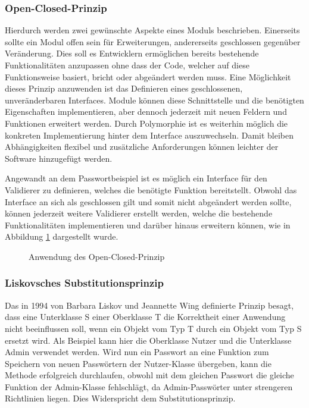\documentclass[conference]{IEEEtran}
\begin{document}
\subsubsection{Open-Closed-Prinzip} Hierdurch werden zwei gewünschte Aspekte eines Moduls beschrieben. Einerseits sollte ein Modul offen sein für Erweiterungen, andererseits geschlossen gegenüber Veränderung. Dies soll es Entwicklern ermöglichen bereits bestehende Funktionalitäten anzupassen ohne dass der Code, welcher auf diese Funktionsweise basiert, bricht oder abgeändert werden muss. Eine Möglichkeit dieses Prinzip anzuwenden ist das Definieren eines geschlossenen, unveränderbaren Interfaces. Module können diese Schnittstelle und die benötigten Eigenschaften implementieren, aber dennoch jederzeit mit neuen Feldern und Funktionen erweitert werden. Durch Polymorphie ist es weiterhin möglich die konkreten Implementierung hinter dem Interface auszuwechseln. Damit bleiben Abhängigkeiten flexibel und zusätzliche Anforderungen können leichter der Software hinzugefügt werden. 

Angewandt an dem Passwortbeispiel ist es möglich ein Interface für den  Validierer zu definieren, welches die benötigte Funktion bereitstellt. Obwohl das Interface an sich als geschlossen gilt und somit nicht abgeändert werden sollte, können jederzeit weitere Validierer erstellt werden, welche die bestehende Funktionalitäten implementieren und darüber hinaus erweitern können, wie in Abbildung \ref{OCP} dargestellt wurde. %

\begin{figure}[htbp]
	\small
	
	\caption{Anwendung des Open-Closed-Prinzip}
	\label{OCP}
\end{figure}



\subsubsection{Liskovsches Substitutionsprinzip} Das in 1994 von Barbara Liskov und Jeannette Wing definierte Prinzip besagt, dass eine Unterklasse S einer Oberklasse T die Korrektheit einer Anwendung nicht beeinflussen soll, wenn ein Objekt vom Typ T durch ein Objekt vom Typ S ersetzt wird. Als Beispiel kann hier die Oberklasse Nutzer und die Unterklasse Admin verwendet werden. Wird nun ein Passwort an eine Funktion zum Speichern von neuen Passwörtern der Nutzer-Klasse übergeben, kann die Methode erfolgreich durchlaufen, obwohl mit dem gleichen Passwort die gleiche Funktion der Admin-Klasse fehlschlägt, da Admin-Passwörter unter strengeren Richtlinien liegen. Dies Widerspricht dem Substitutionsprinzip.
\end{document}
